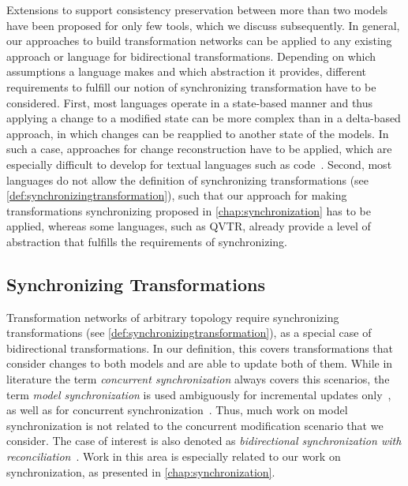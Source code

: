 Extensions to support consistency preservation between more than two models have been proposed for only few tools, which we discuss subsequently.
In general, our approaches to build transformation networks can be applied to any existing approach or language for bidirectional transformations.
Depending on which assumptions a language makes and which abstraction it provides, different requirements to fulfill our notion of synchronizing transformation have to be considered.
First, most languages operate in a state-based manner and thus applying a change to a modified state can be more complex than in a delta-based approach, in which changes can be reapplied to another state of the models. 
In such a case, approaches for change reconstruction have to be applied, which are especially difficult to develop for textual languages such as code~\cite{falleri2014codeDifferencing-ASE}.
Second, most languages do not allow the definition of synchronizing transformations (see \autoref{def:synchronizingtransformation}), such that our approach for making transformations synchronizing proposed in \autoref{chap:synchronization} has to be applied, whereas some languages, such as \gls{QVTR}, already provide a level of abstraction that fulfills the requirements of synchronizing.


\subsection{Synchronizing Transformations}

Transformation networks of arbitrary topology require synchronizing transformations (see \autoref{def:synchronizingtransformation}), as a special case of bidirectional transformations.
In our definition, this covers transformations that consider changes to both models and are able to update both of them.
While in literature the term \emph{concurrent synchronization} always covers this scenarios, the term \emph{model synchronization} is used ambiguously for incremental updates only~\cite{giese2009incrementalModelSynchronization-SoSym}, as well as for concurrent synchronization~\cite{samimi-dehkordi2015bidirectionalSynchronization-ICCKE}.
Thus, much work on model synchronization is not related to the concurrent modification scenario that we consider.
The case of interest is also denoted as \emph{bidirectional synchronization with reconciliation}~\cite{antkiewicz2008synchronizationDesignSpace-GTTSE}.
Work in this area is especially related to our work on synchronization, as presented in \autoref{chap:synchronization}.

